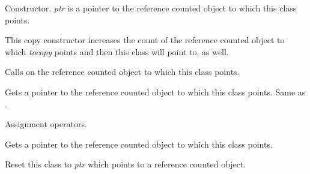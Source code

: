 
Constructor. {\it ptr} is a pointer to the reference
counted object to which this class points.


This copy constructor increases the count of the reference
counted object to which {\it tocopy} points and then this
class will point to, as well.

\label{wxobjectdataptrdtor}


Calls  on the reference
counted object to which this class points.

\label{wxobjectdataptroperatorpointer}


Gets a pointer to the reference counted object to which
this class points. Same as .

\label{wxobjectdataptroperatorassign}



Assignment operators.

\label{wxobjectdataptrget}


Gets a pointer to the reference counted object to which
this class points.

\label{wxobjectdataptrreset}


Reset this class to {\it ptr} which points to a reference
counted object.
